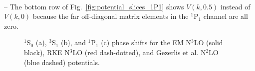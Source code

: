 \documentclass[preprintnumbers,floatfix,aps,prc,preprint,nofootinbib]{revtex4-1}
\begin{document}
\\
-- The bottom row of Fig.~\ref{fig:potential_slices_1P1} shows $V(k,0.5)$ instead of $V(k,0)$ because the far off-diagonal matrix elements in the $^1$P$_1$ channel are all zero.
\begin{figure}[H]
	\centering
	\quad
	\quad
	\caption{$^1$S$_0$ (a), $^3$S$_1$ (b), and $^1$P$_1$ (c) phase shifts for the EM N$^3$LO (solid black), RKE N$^3$LO (red dash-dotted), and Gezerlis et al. N$^2$LO (blue dashed) potentials.}
	\label{fig:phase_shifts}
\end{figure}
%
\end{document}

